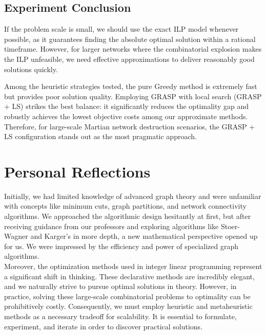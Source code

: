 \documentclass{article}
\begin{document}
\subsection{Experiment Conclusion}

If the problem scale is small, we should use the exact ILP model whenever possible, as it guarantees finding the absolute optimal solution within a rational timeframe. However, for larger networks where the combinatorial explosion makes the ILP unfeasible, we need effective approximations to deliver reasonably good solutions quickly.

Among the heuristic strategies tested, the pure Greedy method is extremely fast but provides poor solution quality. Employing GRASP with local search (GRASP + LS) strikes the best balance: it significantly reduces the optimality gap and robustly achieves the lowest objective costs among our approximate methods. Therefore, for large-scale Martian network destruction scenarios, the GRASP + LS configuration stands out as the most pragmatic approach.

\section{Personal Reflections}

Initially, we had limited knowledge of advanced graph theory and were unfamiliar with concepts like minimum cuts, graph partitions, and network connectivity algorithms. We approached the algorithmic design hesitantly at first, but after receiving guidance from our professors and exploring algorithms like Stoer-Wagner and Karger's in more depth, a new mathematical perspective opened up for us. We were impressed by the efficiency and power of specialized graph algorithms.\\
Moreover, the optimization methods used in integer linear programming represent a significant shift in thinking. These declarative methods are incredibly elegant, and we naturally strive to pursue optimal solutions in theory. However, in practice, solving these large-scale combinatorial problems to optimality can be prohibitively costly.
Consequently, we must employ heuristic and metaheuristic methods as a necessary tradeoff for scalability. It is essential to formulate, experiment, and iterate in order to discover practical solutions.\\

\end{document}

